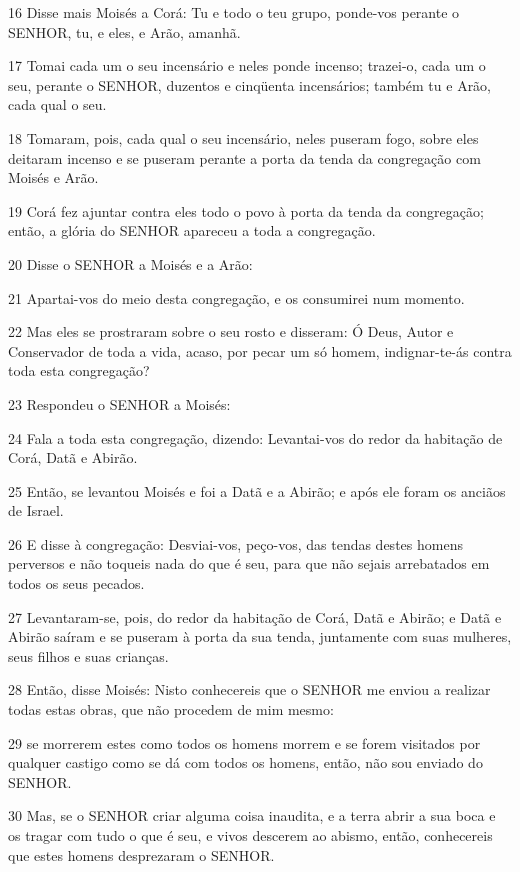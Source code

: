 \par 16 Disse mais Moisés a Corá: Tu e todo o teu grupo, ponde-vos perante o SENHOR, tu, e eles, e Arão, amanhã.
\par 17 Tomai cada um o seu incensário e neles ponde incenso; trazei-o, cada um o seu, perante o SENHOR, duzentos e cinqüenta incensários; também tu e Arão, cada qual o seu.
\par 18 Tomaram, pois, cada qual o seu incensário, neles puseram fogo, sobre eles deitaram incenso e se puseram perante a porta da tenda da congregação com Moisés e Arão.
\par 19 Corá fez ajuntar contra eles todo o povo à porta da tenda da congregação; então, a glória do SENHOR apareceu a toda a congregação.
\par 20 Disse o SENHOR a Moisés e a Arão:
\par 21 Apartai-vos do meio desta congregação, e os consumirei num momento.
\par 22 Mas eles se prostraram sobre o seu rosto e disseram: Ó Deus, Autor e Conservador de toda a vida, acaso, por pecar um só homem, indignar-te-ás contra toda esta congregação?
\par 23 Respondeu o SENHOR a Moisés:
\par 24 Fala a toda esta congregação, dizendo: Levantai-vos do redor da habitação de Corá, Datã e Abirão.
\par 25 Então, se levantou Moisés e foi a Datã e a Abirão; e após ele foram os anciãos de Israel.
\par 26 E disse à congregação: Desviai-vos, peço-vos, das tendas destes homens perversos e não toqueis nada do que é seu, para que não sejais arrebatados em todos os seus pecados.
\par 27 Levantaram-se, pois, do redor da habitação de Corá, Datã e Abirão; e Datã e Abirão saíram e se puseram à porta da sua tenda, juntamente com suas mulheres, seus filhos e suas crianças.
\par 28 Então, disse Moisés: Nisto conhecereis que o SENHOR me enviou a realizar todas estas obras, que não procedem de mim mesmo:
\par 29 se morrerem estes como todos os homens morrem e se forem visitados por qualquer castigo como se dá com todos os homens, então, não sou enviado do SENHOR.
\par 30 Mas, se o SENHOR criar alguma coisa inaudita, e a terra abrir a sua boca e os tragar com tudo o que é seu, e vivos descerem ao abismo, então, conhecereis que estes homens desprezaram o SENHOR.
